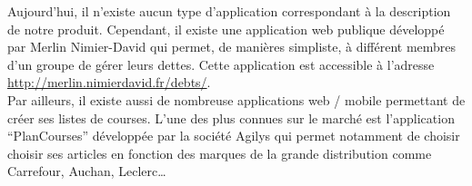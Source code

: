 Aujourd'hui, il n'existe aucun type d'application correspondant à la description de notre produit. Cependant, il existe une application web publique développé par Merlin Nimier-David qui permet, de manières simpliste, à différent membres d'un groupe de gérer leurs dettes. Cette application est accessible à l'adresse \url{http://merlin.nimierdavid.fr/debts/}.\\

Par ailleurs, il existe aussi de nombreuse applications web / mobile permettant de créer ses listes de courses. L'une des plus connues sur le marché est l'application ``PlanCourses'' développée par la société Agilys qui permet notamment de choisir choisir ses articles en fonction des marques de la grande distribution comme Carrefour, Auchan, Leclerc\ldots